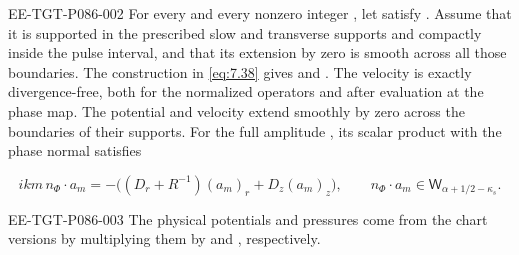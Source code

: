 \begin{lemma}\label{lem:7.7}
\begin{EESegment}{EE-TGT-P086-002}
For every  and every nonzero integer
, let  satisfy
. Assume that it is supported in the prescribed slow and
transverse supports and compactly inside the pulse interval, and that its extension by zero is smooth
across all those boundaries. The construction in \eqref{eq:7.38} gives
 and
. The velocity
 is exactly divergence-free,
both for the normalized operators and after evaluation at the phase map. The potential and velocity
extend smoothly by zero across the boundaries of their supports. For the full amplitude
, its scalar product with the phase normal satisfies
\end{EESegment}
\begin{equation}
  ikm\,n_\Phi\cdot a_m
  =-\bigl((D_r+R^{-1})(a_m)_r+D_z(a_m)_z\bigr),
  \qquad n_\Phi\cdot a_m\in \mathsf W_{\alpha+1/2-\kappa_s}.
\tag{7.39}\label{eq:7.39}
\end{equation}
\begin{EESegment}{EE-TGT-P086-003}
The physical potentials and pressures come from the chart versions by multiplying them by
 and , respectively.
\end{EESegment}
\end{lemma}

